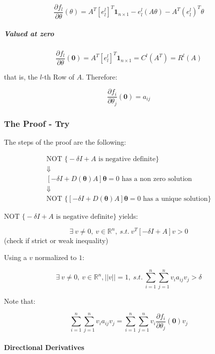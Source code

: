 \documentclass[12pt]{article}
\newcommand\ddfrac[2]{\frac{\displaystyle #1}{\displaystyle #2}}
\begin{document}
 \[ \ddfrac{\partial f_l}{\partial \theta} (\theta) =
 A^T \left[ e_l^l \right]^T \bm{1}_{n \times 1}   -  e^l_l (A \theta) - A^T (e_l^l)^T \theta  \]

\subparagraph{Valued at zero}

 \[ \ddfrac{\partial f_l}{\partial \theta} (\bm{0}) = A^T \left[ e_l^l \right]^T \bm{1}_{n \times 1}  = C^l\left(A^T \right) = R^l(A) \]

that is, the $l$-th Row of $A$. Therefore:

 \[ \ddfrac{\partial f_i}{\partial \theta_j} (\bm{0}) =a_{ij} \]

\subsubsection{The Proof - Try}
\begin{framed}
The steps of the proof are the following:

\[ \begin{array}{c}
\text{NOT } \Big\{ -\delta I + A \text{ is  negative definite} \Big\} \\
\Downarrow \\
\left[-\delta I + D(\bm{\theta}) A \right] \bm{\theta} = 0 \text{ has a non zero solution} \\
\Downarrow \\
\text{NOT } \Big\{ \left[-\delta I + D(\bm{\theta}) A \right] \bm{\theta} = 0 \text{ has a unique solution} \Big\}
\end{array} \]
\end{framed}

$\text{NOT } \Big\{ -\delta I + A \text{ is  negative definite} \Big\}$ yields:

\[ \exists \ v \neq 0, \ v \in \mathbb{R}^n, \ s.t. \ v^T [-\delta I + A ] v >0 \] (check if strict or weak inequality)

Using a $v$ normalized to $1$:

\begin{equation} \exists \ v \neq 0, \ v \in \mathbb{R}^n, ||v||=1, \ s.t. \ \sum_{i=1}^n \sum_{j=1}^{n} v_i a_{ij} v_j > \delta 
\label{eq:ndf}
\end{equation}

Note that:

\[ \sum_{i=1}^n \sum_{j=1}^{n} v_i a_{ij} v_j =  \sum_{i=1}^n \sum_{j=1}^{n} v_i \ddfrac{\partial f_i}{\partial \theta_j} (\bm{0}) v_j \] 

\paragraph{Directional Derivatives}
\end{document}
